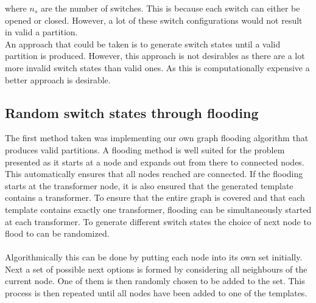 where $n_{s}$ are the number
of switches. This is because each switch can either be opened or closed. However,
a lot of these switch configurations would not result in valid a partition.\\
An approach that could be taken is to generate switch states until a valid
partition is produced. However, this approach is not desirables as
there are a lot more invalid switch states than valid ones. As this
is computationally expensive a better approach is desirable.

\subsection{Random switch states through flooding}
The first method taken was implementing our own graph flooding algorithm that
produces valid partitions. A flooding method is well suited for the problem presented
as it starts at a node and expands out from there to connected nodes. This automatically
ensures that all nodes reached are connected. If the flooding starts at the 
transformer node, it is also ensured that the generated template contains a
transformer. To ensure that the entire graph is covered and that each template contains
exactly one transformer, flooding can be simultaneously started at each transformer.
To generate different switch states the choice of next node to flood to can be
randomized.\\
\\
Algorithmically this can be done by putting each node into its
own set initially.
Next a set of possible next options is formed by considering all neighbours of the
current node. One of them is then randomly chosen to be added to the set.
This process is then repeated until
all nodes have been added to one of the templates. 

